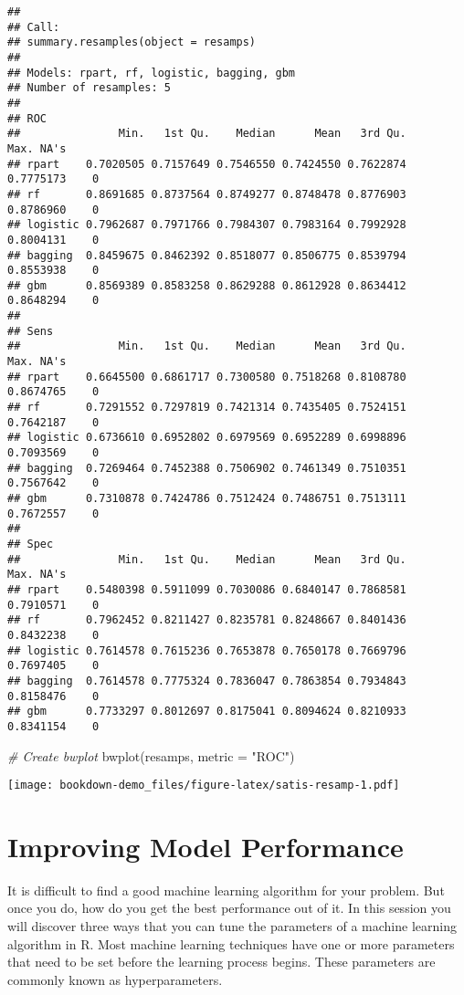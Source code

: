 \documentclass[
]{book}
\newenvironment{Shaded}{\begin{snugshade}}{\end{snugshade}}
\newcommand{\AttributeTok}[1]{\textcolor[rgb]{0.77,0.63,0.00}{#1}}
\newcommand{\CommentTok}[1]{\textcolor[rgb]{0.56,0.35,0.01}{\textit{#1}}}
\newcommand{\FunctionTok}[1]{\textcolor[rgb]{0.00,0.00,0.00}{#1}}
\newcommand{\NormalTok}[1]{#1}
\newcommand{\StringTok}[1]{\textcolor[rgb]{0.31,0.60,0.02}{#1}}
\begin{document}
\begin{verbatim}
## 
## Call:
## summary.resamples(object = resamps)
## 
## Models: rpart, rf, logistic, bagging, gbm 
## Number of resamples: 5 
## 
## ROC 
##               Min.   1st Qu.    Median      Mean   3rd Qu.      Max. NA's
## rpart    0.7020505 0.7157649 0.7546550 0.7424550 0.7622874 0.7775173    0
## rf       0.8691685 0.8737564 0.8749277 0.8748478 0.8776903 0.8786960    0
## logistic 0.7962687 0.7971766 0.7984307 0.7983164 0.7992928 0.8004131    0
## bagging  0.8459675 0.8462392 0.8518077 0.8506775 0.8539794 0.8553938    0
## gbm      0.8569389 0.8583258 0.8629288 0.8612928 0.8634412 0.8648294    0
## 
## Sens 
##               Min.   1st Qu.    Median      Mean   3rd Qu.      Max. NA's
## rpart    0.6645500 0.6861717 0.7300580 0.7518268 0.8108780 0.8674765    0
## rf       0.7291552 0.7297819 0.7421314 0.7435405 0.7524151 0.7642187    0
## logistic 0.6736610 0.6952802 0.6979569 0.6952289 0.6998896 0.7093569    0
## bagging  0.7269464 0.7452388 0.7506902 0.7461349 0.7510351 0.7567642    0
## gbm      0.7310878 0.7424786 0.7512424 0.7486751 0.7513111 0.7672557    0
## 
## Spec 
##               Min.   1st Qu.    Median      Mean   3rd Qu.      Max. NA's
## rpart    0.5480398 0.5911099 0.7030086 0.6840147 0.7868581 0.7910571    0
## rf       0.7962452 0.8211427 0.8235781 0.8248667 0.8401436 0.8432238    0
## logistic 0.7614578 0.7615236 0.7653878 0.7650178 0.7669796 0.7697405    0
## bagging  0.7614578 0.7775324 0.7836047 0.7863854 0.7934843 0.8158476    0
## gbm      0.7733297 0.8012697 0.8175041 0.8094624 0.8210933 0.8341154    0
\end{verbatim}

\begin{Shaded}
\begin{Highlighting}[]
\CommentTok{\# Create bwplot}
\FunctionTok{bwplot}\NormalTok{(resamps, }\AttributeTok{metric =} \StringTok{"ROC"}\NormalTok{)}
\end{Highlighting}
\end{Shaded}

\texttt{[image: bookdown-demo\_files/figure-latex/satis-resamp-1.pdf]}

\hypertarget{improving-model-performance-1}{%
\section{Improving Model Performance}\label{improving-model-performance-1}}

It is difficult to find a good machine learning algorithm for your problem. But once you do, how do you get the best performance out of it. In this session you will discover three ways that you can tune the parameters of a machine learning algorithm in R. Most machine learning techniques have one or more parameters that need to be set before the learning process begins. These parameters are commonly known as hyperparameters.
\end{document}
